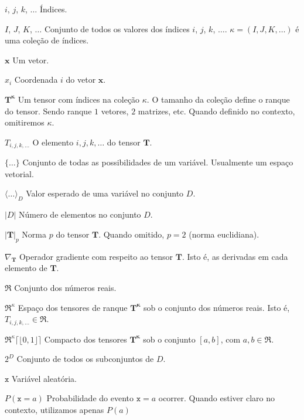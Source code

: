 \begin{simbolos}

  \item[$i$, $j$, $k$, $\ldots$] Índices.

  \item[$I$, $J$, $K$, $\ldots$] Conjunto de todos os valores dos índices $i$, $j$, $k$, $\ldots$. $\kappa = (I, J, K, \ldots)$ é uma coleção de índices.

  \item[$\mathbf{x}$] Um vetor.
	 
  \item[$x_i$] Coordenada $i$ do vetor $\mathbf{x}$.
   
  \item[$\mathbf{T^{\kappa}}$] Um tensor com índices na coleção $\kappa$. O tamanho da coleção define o ranque do tensor. Sendo ranque $1$ vetores, $2$ matrizes, etc. Quando definido no contexto, omitiremos $\kappa$.
  
  \item[$T_{i, j, k, \ldots}$] O elemento $i, j, k, \ldots$ do tensor $\mathbf{T}$.
  
  \item[$ \{\ldots\} $] Conjunto de todas as possibilidades de um variável. Usualmente um espaço vetorial.

  \item[$ \langle \ldots \rangle_{D} $] Valor esperado de uma variável no conjunto $D$.

  \item[$| D |$] Número de elementos no conjunto $D$.

  \item[$| \mathbf{T} |_p$] Norma $p$ do tensor $\mathbf{T}$. Quando omitido, $p=2$ (norma euclidiana).

  \item[$\nabla_{\mathbf{T}}$] Operador gradiente com respeito ao tensor $\mathbf{T}$. Isto é, as derivadas em cada elemento de $\mathbf{T}$.
    
  \item[$\Re$] Conjunto dos números reais.
  
  \item[$\Re^{\kappa}$] Espaço dos tensores de ranque $\mathbf{T^{\kappa}}$ sob o conjunto dos números reais. Isto é, $T_{i, j, k, \ldots} \in \Re$.
  
  \item[$ \Re^{\kappa} \lceil \!\!\! \lfloor0,1 \rfloor \!\!\! \rceil $] Compacto dos tensores $\mathbf{T^{\kappa}}$ sob o conjunto $[a,b]$, com $a, b \in \Re$. 
  
  \item[$2^D$] Conjunto de todos os subconjuntos de $D$.
  
  \item[$\mathtt{x}$] Variável aleatória.
  
  \item[$P(\mathtt{x}=a)$] Probabilidade do evento $\mathtt{x}=a$ ocorrer. Quando estiver claro no contexto, utilizamos apenas $P(a)$
  

\end{simbolos}